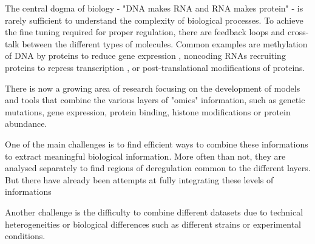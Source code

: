 The central dogma of biology - "DNA makes RNA and RNA makes protein" - is rarely sufficient to understand the complexity of biological processes. To achieve the fine tuning required for proper regulation, there are feedback loops and cross-talk between the different types of molecules. Common examples are methylation of DNA by proteins to reduce gene expression \cite{Zemach2010}, noncoding RNAs recruiting proteins to repress transcription \cite{Wang2008}, or post-translational modifications of proteins.

There is now a growing area of research focusing on the development of models and tools that combine the various layers of "omics" information, such as genetic mutations, gene expression, protein binding, histone modifications or protein abundance. 

One of the main challenges is to find efficient ways to combine these informations to extract meaningful biological information. More often than not, they are analysed separately to find regions of deregulation common to the different layers. But there have already been attempts at fully integrating these levels of informations %

Another challenge is the difficulty to combine different datasets due to technical heterogeneities or biological differences such as different strains or experimental conditions.
